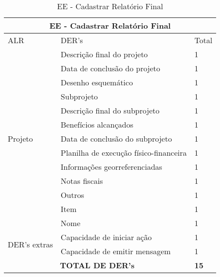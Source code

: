 \begin{table}[!h]
\centering
\caption{EE - Cadastrar Relatório Final}
\label{ee_cadastrar_relatório_final}
\begin{tabular}{|l|l|l|}
\hline
\multicolumn{3}{|c|}{EE - Cadastrar Relatório Final}                                                                 \\ \hline
ALR                           & DER's                                                & Total              \\ \hline
\multirow{13}{*}{Projeto}     & Descrição final do projeto             & 1 \\ \cline{2-3}
                             & Data de conclusão do projeto           & 1 \\ \cline{2-3}
                             & Desenho esquemático                    & 1 \\ \cline{2-3} 
			      & Subprojeto                             & 1 \\ \cline{2-3}
                             & Descrição final do subprojeto          & 1 \\ \cline{2-3}
                             & Benefícios alcançados                  & 1 \\ \cline{2-3}
                             & Data de conclusão do subprojeto        & 1 \\ \cline{2-3}
                             & Planilha de execução físico-financeira & 1 \\ \cline{2-3}
                             & Informações georreferenciadas          & 1 \\ \cline{2-3}
                             & Notas fiscais                          & 1 \\ \cline{2-3}
                             & Outros                                 & 1 \\ \cline{2-3}
                             & Item                                   & 1 \\ \cline{2-3}
                             & Nome                                   & 1 \\ \cline{2-3} \hline
\multirow{2}{*}{DER's extras} & Capacidade de iniciar ação             & 1 \\ \cline{2-3}
                 & Capacidade de emitir mensagem& 1 \\ \hline

\multicolumn{2}{|c|}{\textbf{TOTAL DE DER's}}                                                 & \textbf{15}                 \\ \hline
\end{tabular}
\end{table}




